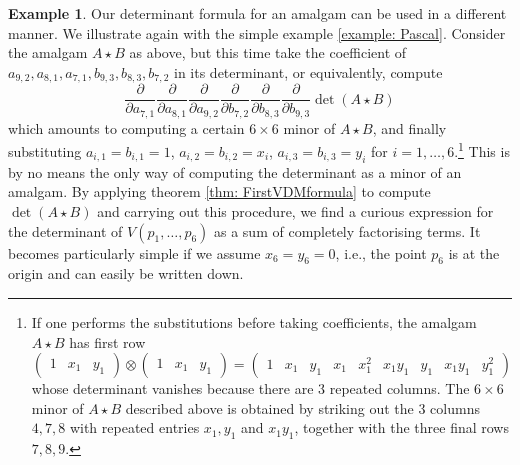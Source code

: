 \documentclass[10pt]{amsart}
\theoremstyle{definition}
\newtheorem{example}[thm]{Example}
\theoremstyle{remark}
\numberwithin{equation}{section}
\newcommand{\0}{\color{blue}{\mathsf{0}}}
\begin{document}
\begin{example} \label{example: Pascalconic} Our determinant formula for an amalgam can be used in a different manner. We illustrate again with the  simple example
\ref{example: Pascal}.  Consider the amalgam $A \star B$ as above, but this time  take the coefficient of  $a_{9,2}, a_{8,1}, a_{7,1}, b_{9,3}, b_{8,3}, b_{7,2}$ in its determinant, or equivalently,  compute
\[  \frac{\partial}{\partial a_{7,1}} \frac{\partial}{\partial a_{8,1}}  \frac{\partial}{\partial a_{9,2}}  \frac{\partial}{\partial b_{7,2}}  \frac{\partial}{\partial b_{8,3}}  \frac{\partial}{\partial b_{9,3}}  \det(A\star B) \] 
which amounts to computing  a certain $6\times 6$ minor of $A \star B$, and 
finally substituting $a_{i,1}=b_{i,1}=1$, $a_{i,2}=b_{i,2}=x_i$, $a_{i,3}=b_{i,3}=y_i$ for $i=1,\ldots, 6$.\footnote{If one performs the substitutions before taking coefficients, the amalgam $A \star B$ has first row 
\[  \begin{pmatrix} 1 & x_1  & y_1 \end{pmatrix}  \otimes  \begin{pmatrix} 1 & x_1  & y_1 \end{pmatrix} =  \begin{pmatrix} 1 & x_1  & y_1 & x_1 & x_1^2 & x_1 y_1 & y_1 & x_1y_1 & y_1^2  \end{pmatrix} \]
whose determinant vanishes because there are 3 repeated columns. The $6 \times 6$ minor of $A \star B$ described above is obtained by striking out the 3 columns $4,7,8$  with repeated entries $x_1, y_1$ and $x_1y_1$, together with the three final rows $7,8,9$. } 
This is by no means the only way of computing the determinant as a minor of an amalgam.  By applying theorem \ref{thm: FirstVDMformula} to compute $\det (A \star B)$ and 
 carrying out this procedure,  we
find  a curious expression for  the determinant of $V(p_1,\ldots, p_6)$  as a sum of  completely factorising terms. It becomes particularly simple if we assume $x_6=y_6=0$, i.e., the point $p_6$ is at the origin and can easily be written down. 


\end{example}
\end{document}
